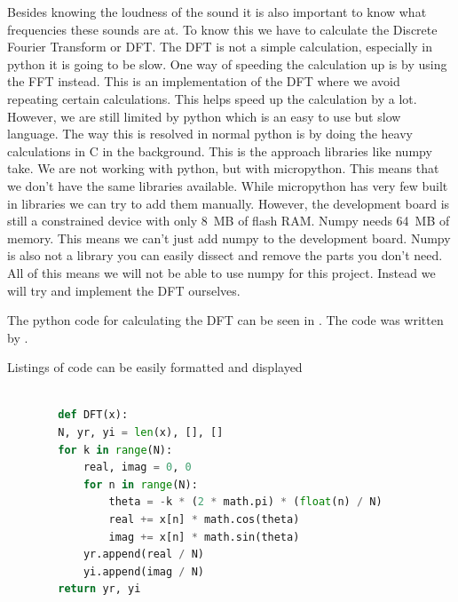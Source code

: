    Besides knowing the loudness of the sound it is also important to know what frequencies these sounds are at. To know this we have to calculate the Discrete Fourier Transform or DFT. The DFT is not a simple calculation, especially in python it is going to be slow. One way of speeding the calculation up is by using the FFT instead. This is an implementation of the DFT where we avoid repeating certain calculations. This helps speed up the calculation by a lot. However, we are still limited by python which is an easy to use but slow language. The way this is resolved in normal python is by doing the heavy calculations in C in the background. This is the approach libraries like numpy take. We are not working with python, but with micropython. This means that we don't have the same libraries available. While micropython has very few built in libraries we can try to add them manually. However, the development board is still a constrained device with only 8~MB of flash RAM. Numpy needs 64~MB of memory. This means we can't just add numpy to the development board. Numpy is also not a library you can easily dissect and remove the parts you don't need. All of this means we will not be able to use numpy for this project. Instead we will try and implement the DFT ourselves.

    The python code for calculating the DFT can be seen in . The code was written by \cite{chenPythonImplementationDFT}.


    \begin{frame}[fragile]{Listings of code can be easily formatted and displayed}
      \begin{lstlisting}[language=Python, caption={DFT method},label={list: DFT}]
      
        def DFT(x):
        N, yr, yi = len(x), [], []
        for k in range(N):
            real, imag = 0, 0
            for n in range(N):
                theta = -k * (2 * math.pi) * (float(n) / N)
                real += x[n] * math.cos(theta)
                imag += x[n] * math.sin(theta)
            yr.append(real / N)
            yi.append(imag / N)
        return yr, yi
  
      \end{lstlisting}
    \end{frame}

